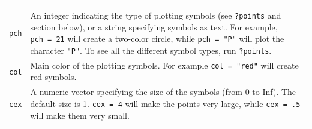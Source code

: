 \documentclass[]{book}
\theoremstyle{definition}
\theoremstyle{definition}
\theoremstyle{remark}
\begin{document}
\begin{longtable}[]{@{}ll@{}}
\begin{minipage}[t]{0.67\columnwidth}
\end{minipage}\tabularnewline
\begin{minipage}[t]{0.18\columnwidth}\raggedright\strut
\texttt{pch}\strut
\end{minipage} & \begin{minipage}[t]{0.67\columnwidth}\raggedright\strut
An integer indicating the type of plotting symbols (see \texttt{?points}
and section below), or a string specifying symbols as text. For example,
\texttt{pch\ =\ 21} will create a two-color circle, while
\texttt{pch\ =\ "P"} will plot the character \texttt{"P"}. To see all
the different symbol types, run \texttt{?points}.\strut
\end{minipage}\tabularnewline
\begin{minipage}[t]{0.18\columnwidth}\raggedright\strut
\texttt{col}\strut
\end{minipage} & \begin{minipage}[t]{0.67\columnwidth}\raggedright\strut
Main color of the plotting symbols. For example \texttt{col\ =\ "red"}
will create red symbols.\strut
\end{minipage}\tabularnewline
\begin{minipage}[t]{0.18\columnwidth}\raggedright\strut
\texttt{cex}\strut
\end{minipage} & \begin{minipage}[t]{0.67\columnwidth}\raggedright\strut
A numeric vector specifying the size of the symbols (from 0 to Inf). The
default size is 1. \texttt{cex\ =\ 4} will make the points very large,
while \texttt{cex\ =\ .5} will make them very small.\strut
\end{minipage}\tabularnewline
\bottomrule
\end{longtable}
\end{document}
